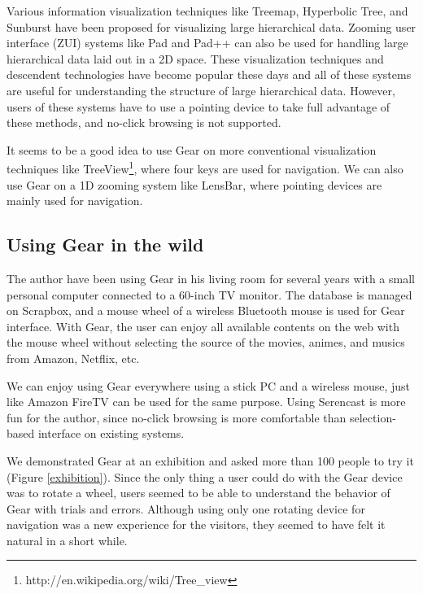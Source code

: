 \documentclass[conference]{IEEEtran}
\def\SC{Serencast}
\def\SB{Scrapbox}
\begin{document}
Various information visualization techniques like
Treemap\cite{Johnson:1991:TSA:949607.949654},
Hyperbolic Tree\cite{Lamping:1995:FTB:223904.223956},
and Sunburst\cite{Stasko:2000:FDN:857190.857683}
have been proposed for visualizing large hierarchical data.
Zooming user interface (ZUI) systems like
Pad\cite{Perlin:1993:PAA:166117.166125} and
Pad++\cite{Bederson:1994:PZG:192426.192435}
can also be used for handling large hierarchical data laid out in a 2D space.
%
These visualization techniques and descendent technologies have become popular these days and
all of these systems are useful for understanding the structure of
large hierarchical data.
However, users of these systems have to use a pointing device
to take full advantage of these methods, and
no-click browsing is not supported.

It seems to be a good idea to use Gear on more conventional visualization techniques like
TreeView\footnote{
  \textsf{http://en.wikipedia.org/wiki/Tree\_view}
}, where four keys are used for navigation.
%
We can also use Gear on a 1D zooming system like
LensBar\cite{Masui:1998:LVB:647341.721215},
where pointing devices are mainly used for navigation.


\subsection{Using Gear in the wild}

The author have been using Gear in his living room for several years
with a small personal computer connected to a 60-inch TV monitor.
The database is managed on {\SB}, and
a mouse wheel of a wireless Bluetooth mouse is used for Gear interface.
With Gear, the user can enjoy all available contents on the web with the mouse wheel
without selecting the source of the movies, animes, and musics from Amazon, Netflix, etc.

We can enjoy using Gear everywhere using a stick PC and a wireless mouse,
just like Amazon FireTV can be used for the same purpose.
Using {\SC} is more fun for the author, since no-click browsing is more comfortable than
selection-based interface on existing systems.

We demonstrated Gear at an exhibition
and asked more than 100 people to try it
(Figure \ref{exhibition}).
%
Since the only thing a user could do with the Gear device was to rotate a wheel,
users seemed to be able to understand the behavior of Gear with trials and errors.
% 
% 
Although using only one rotating device for navigation was a new experience for the visitors,
they seemed to have felt it natural in a short while.
\end{document}
